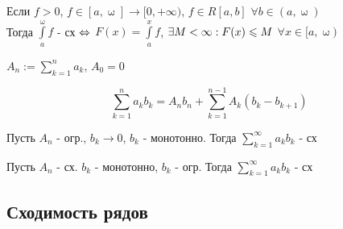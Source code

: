 \documentclass[main]{subfiles}
\begin{document}
      \begin{lemma}
          Если $f>0$, $f \in [a, \upomega] \rightarrow [0, +\infty)$, $f\in R[a,b]$ $\forall b \in (a, \upomega)$
          \\
          Тогда $\int\limits_a^\upomega f$ - сх $\Leftrightarrow$ $F(x) = \int\limits_a^x f$, $\exists M < \infty:  F(x) \leqslant M $ $\forall x \in [a, \upomega)$
      \end{lemma}

      \begin{definition}
          $A_n := \sum\limits_{k=1}^n a_k$, $A_0=0$
      \end{definition}

      \begin{Theorem} 
          \[\sum\limits_{k=1}^n a_k b_k = A_n b_n + \sum\limits_{k=1}^{n-1} A_k (b_k - b_{k+1})\]
      \end{Theorem}

      \begin{theorem} 
          Пусть $A_n$ - огр., $b_k \rightarrow 0$, $b_k$ - монотонно. Тогда $\sum\limits_{k=1}^\infty a_k b_k$ - сх
      \end{theorem}

      \begin{theorem} 
          Пусть $A_n$ - сх. $b_k$ - монотонно, $b_k$ - огр. Тогда $\sum\limits_{k=1}^\infty a_k b_k$ - сх
      \end{theorem}

    \subsection{Сходимость рядов}

    
\end{document}
